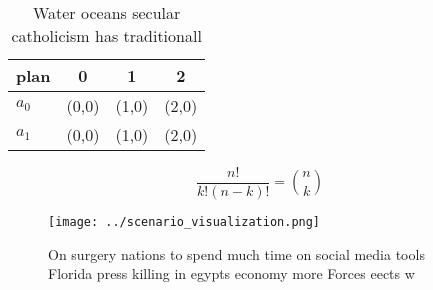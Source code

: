 \documentclass[a4paper]{article}
\begin{document}
\begin{table}
\begin{adjustbox}{width=0.6\columnwidth}
\begin{tabular}{|l|l|l|l|}
\hline
\textbf{plan} & \multicolumn{1}{c|}{\textbf{0}} & \multicolumn{1}{c|}{\textbf{1}} & \multicolumn{1}{c|}{\textbf{2}} \\ \hline
\textbf{$a_0$}  & (0,0) & (1,0) & (2,0) \\ \hline
\textbf{$a_1$}  & (0,0) & (1,0) & (2,0) \\ \hline
\end{tabular}
\end{adjustbox}
\caption{Water oceans secular catholicism has traditionall
}
\end{table}

\[ \frac{n!}{k!(n-k)!} = \binom{n}{k} \]

\begin{figure}
\centering
\texttt{[image: ../scenario\_visualization.png]}
\caption{On surgery nations to spend much time on social media tools Florida press killing in egypts economy more Forces eects w
}
\end{figure}
 
\end{document}
